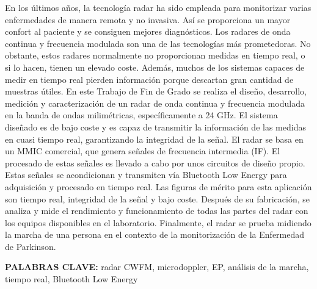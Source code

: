 En los últimos años, la tecnología radar ha sido empleada para monitorizar varias enfermedades de manera remota y no invasiva. Así se proporciona un mayor confort al paciente y se consiguen mejores diagnósticos. Los radares de onda continua y frecuencia modulada son una de las tecnologías más prometedoras. No obstante, estos radares normalmente no proporcionan medidas en tiempo real, o si lo hacen, tienen un elevado coste. Además, muchos de los sistemas capaces de medir en tiempo real pierden información porque descartan gran cantidad de muestras útiles.
En este Trabajo de Fin de Grado se realiza el diseño, desarrollo, medición y caracterización de un radar de onda continua y frecuencia modulada en la banda de ondas milimétricas, específicamente a 24 GHz. El sistema diseñado es de bajo coste y es capaz de transmitir la información de las medidas en cuasi tiempo real, garantizando la integridad de la señal.
El radar se basa en un MMIC comercial, que genera señales de frecuencia intermedia (IF). El procesado de estas señales es llevado a cabo por unos circuitos de diseño propio. Estas señales se acondicionan y transmiten vía Bluetooth Low Energy para adquisición y procesado en tiempo real. Las figuras de mérito para esta aplicación son tiempo real, integridad de la señal y bajo coste.
Después de su fabricación, se analiza y mide el rendimiento y funcionamiento de todas las partes del radar con los equipos disponibles en el laboratorio.
Finalmente, el radar se prueba midiendo la marcha de una persona en el contexto de la monitorización de la Enfermedad de Parkinson.


\vspace{2cm}
\noindent \textbf{PALABRAS CLAVE:} radar CWFM, microdoppler, EP, análisis de la marcha, tiempo real, Bluetooth Low Energy\\[3mm]


\clearpage

